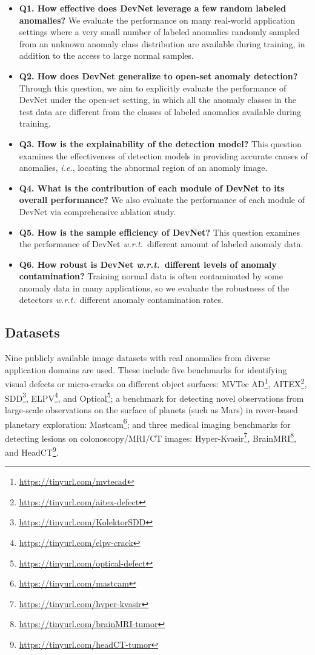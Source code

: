\documentclass[10pt,journal,compsoc]{IEEEtran}
\newcommand{\ie}{\textit{i.e.}}
\begin{document}
\begin{itemize}
    \item \textbf{Q1. How effective does DevNet leverage a few random labeled anomalies?} We evaluate the performance on many real-world application settings where a very small number of labeled anomalies randomly sampled from an unknown anomaly class distribution are available during training, in addition to the access to large normal samples.
    \item \textbf{Q2. How does DevNet generalize to open-set anomaly detection?} Through this question, we aim to explicitly evaluate the performance of DevNet under the open-set setting, in which all the anomaly classes in the test data are different from the classes of labeled anomalies available during training. 
    \item \textbf{Q3. How is the explainability of the detection model?} This question examines the effectiveness of detection models in providing accurate causes of anomalies, \ie, locating the abnormal region of an anomaly image.
    \item \textbf{Q4. What is the contribution of each module of DevNet to its overall performance?} We also evaluate the performance of each module of DevNet via comprehensive ablation study.
    \item \textbf{Q5. How is the sample efficiency of DevNet?} This question examines the performance of DevNet \textit{w.r.t.}\  different amount of labeled anomaly data.
    \item \textbf{Q6. How robust is DevNet \textit{w.r.t.}\  different levels of anomaly contamination?} Training normal data is often contaminated by some anomaly data in many applications, so we evaluate the robustness of the detectors \textit{w.r.t.}\  different anomaly contamination rates.
\end{itemize}


\subsection{Datasets}
Nine publicly available image datasets with real anomalies from diverse application domains are used. These include five benchmarks for identifying visual defects or micro-cracks on different object surfaces: MVTec AD\footnote{\url{https://tinyurl.com/mvtecad}}, AITEX\footnote{\url{https://tinyurl.com/aitex-defect}}, SDD\footnote{\url{https://tinyurl.com/KolektorSDD}}, ELPV\footnote{\url{https://tinyurl.com/elpv-crack}}, and Optical\footnote{\url{https://tinyurl.com/optical-defect}}; a benchmark for detecting novel observations from large-scale observations on the surface of planets (such as Mars) in rover-based planetary exploration: Mastcam\footnote{\url{https://tinyurl.com/mastcam}}; and three medical imaging benchmarks for detecting lesions on colonoscopy/MRI/CT images: Hyper-Kvasir\footnote{\url{https://tinyurl.com/hyper-kvasir}}, BrainMRI\footnote{\url{https://tinyurl.com/brainMRI-tumor}}, and HeadCT\footnote{\url{https://tinyurl.com/headCT-tumor}}. 
\end{document}
